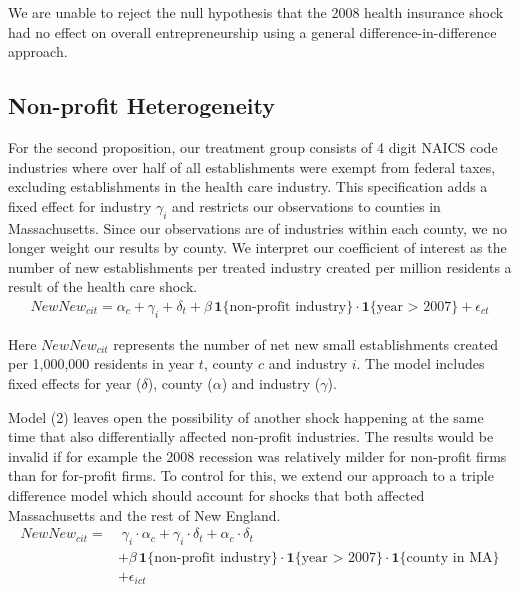 \documentclass[12pt]{article}
\begin{document}
We are unable to reject the null hypothesis that the 2008 health insurance shock had no effect on overall entrepreneurship using a general difference-in-difference approach.

\subsection{Non-profit Heterogeneity}

For the second proposition, our treatment group consists of 4 digit NAICS code industries where over half of all establishments were exempt from federal taxes, excluding establishments in the health care industry. This specification adds a fixed effect for industry $\gamma_i$ and restricts our observations to counties in Massachusetts. Since our observations are of industries within each county, we no longer weight our results by county. We interpret our coefficient of interest as the number of new establishments per treated industry created per million residents a result of the health care shock. 
\begin{align}
NewNew_{cit} = \alpha_c + \gamma_i + \delta_t + \beta \, \mathbf{1}\{\text{non-profit industry}\} \cdot \mathbf{1}\{\text{year > 2007}\} + \epsilon_{ct}
\end{align}

Here $NewNew_{cit}$ represents the number of net new small establishments created per 1,000,000 residents in year $t$, county $c$ and industry $i$. The model includes fixed effects for year ($\delta$), county ($\alpha$) and industry ($\gamma$). 

Model (2) leaves open the possibility of another shock happening at the same time that also differentially affected non-profit industries. The results would be invalid if for example the 2008 recession was relatively milder for non-profit firms than for for-profit firms. To control for this, we extend our approach to a triple difference model which should account for shocks that both affected Massachusetts and the rest of New England. 
\begin{align}
NewNew_{cit} = & \; \gamma_i \cdot \alpha_c + \gamma_i \cdot \delta_t +  \alpha_c \cdot \delta_t \nonumber   \\
& + \beta \, \mathbf{1}\{\text{non-profit industry}\} \cdot \mathbf{1}\{\text{year > 2007}\}  \cdot \mathbf{1}\{\text{county in  MA}\} \nonumber  \\
& + \epsilon_{ict}
\end{align}
\end{document}
